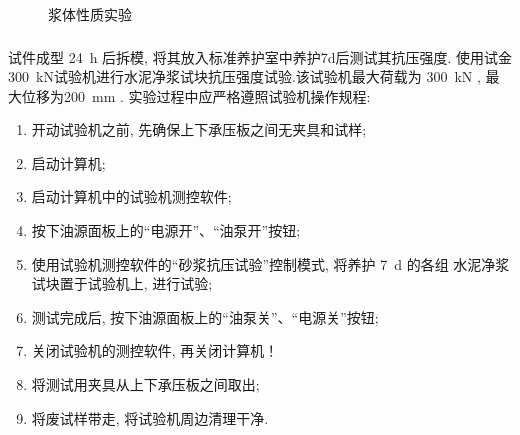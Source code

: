 \begin{figure}
    \centering
    \quad
    \caption{浆体性质实验}
\end{figure}

\subsubsection{}
试件成型 \SI{24}{\hour} 后拆模, 将其放入标准养护室中养护7d后测试其抗压强度.
使用试金\SI{300}{\kilo\newton}试验机进行水泥净浆试块抗压强度试验.该试验机最大荷载为 \SI{300}{\kilo\newton} , 最大位移为\SI{200}{\milli\meter} .
实验过程中应严格遵照试验机操作规程: 
\begin{enumerate}[wide, labelwidth=!, labelindent=0pt]
    \item 开动试验机之前, 先确保上下承压板之间无夹具和试样; 
    \item 启动计算机; 
    \item 启动计算机中的试验机测控软件; 
    \item 按下油源面板上的“电源开”、“油泵开”按钮; 
    \item 使用试验机测控软件的“砂浆抗压试验”控制模式, 将养护 \SI{7}{\day} 的各组  水泥净浆试块置于试验机上, 进行试验; 
    \item 测试完成后, 按下油源面板上的“油泵关”、“电源关”按钮; 
    \item 关闭试验机的测控软件, 再关闭计算机！
    \item 将测试用夹具从上下承压板之间取出; 
    \item 将废试样带走, 将试验机周边清理干净.
\end{enumerate}

